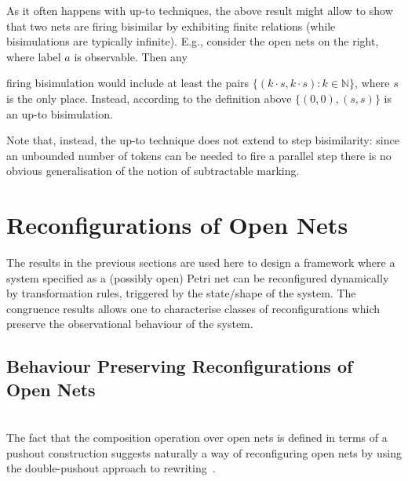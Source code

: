 \documentclass{LMCS}
\begin{document}
As it often happens with up-to techniques, the above result
might allow to show that two nets are firing bisimilar by exhibiting finite
relations (while bisimulations are typically infinite). E.g., consider
the open nets on the right, where label $a$ is observable. Then any\linebreak
\begin{minipage}[c]{0.60\linewidth}
firing bisimulation would include at least
the pairs \linebreak $\{ (k \cdot s, k
\cdot s) : k \in \mathbb{N} \}$, where $s$ is the only place. Instead,
according to the definition above $\{ (0, 0), (s, s) \}$ is an up-to
bisimulation.
\end{minipage}
\begin{minipage}[c]{0.4\linewidth}
  \vspace{1mm}
\begin{center}
\end{center}
\end{minipage}

\smallskip


Note that, instead, the up-to technique does not extend to step
bisimilarity: since an unbounded number of tokens can be needed to
fire a parallel step there is no obvious generalisation of the notion of subtractable marking.


\section{Reconfigurations of Open Nets}


The results in the previous sections are used here to design a
framework where a system specified as a (possibly open) Petri net can
be reconfigured dynamically by transformation rules, triggered by the
state/shape of the system. The congruence results allows one to
characterise classes of reconfigurations which preserve the
observational behaviour of the system. 

\subsection{Behaviour Preserving Reconfigurations of  Open Nets}
\ \\

\noindent
The fact that the composition operation over open nets is defined in terms of a
pushout construction suggests naturally a way of reconfiguring open nets by
using the double-pushout approach to rewriting~\cite{Ehr:TIAA}.
\end{document}
